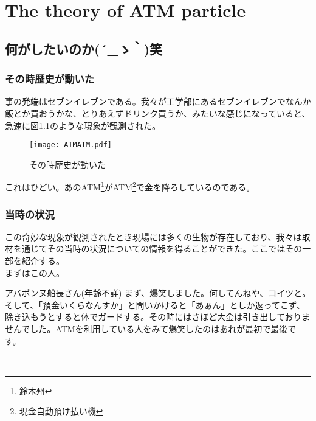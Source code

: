 \chapter{The theory of ATM particle}
\label{theoryofparticle}

\section{何がしたいのか{\sf (´\_ゝ｀)}笑}
\subsection{その時歴史が動いた}
事の発端はセブンイレブンである。我々が工学部にあるセブンイレブンでなんか飯とか買おうかな、とりあえずドリンク買うか、みたいな感じになっていると、急速に図\ref{ATMATM}のような現象が観測された。

\begin{figure}[H]
\centering
\texttt{[image: ATMATM.pdf]}
    \caption{その時歴史が動いた}
    \label{ATMATM}
\end{figure}

これはひどい。あのATM\footnote{鈴木州}がATM\footnote{現金自動預け払い機}で金を降ろしているのである。

\subsection{当時の状況}
この奇妙な現象が観測されたとき現場には多くの生物が存在しており、我々は取材を通じてその当時の状況についての情報を得ることができた。ここではその一部を紹介する。\\

まずはこの人。\\

\begin{itembox}[c]{アバポンヌ船長さん(年齢不詳)}
まず、爆笑しました。何してんねや、コイツと。そして、「預金いくらなんすか」と問いかけると「あぁん」としか返ってこず、除き込もうとすると体でガードする。その時にはさほど大金は引き出しておりませんでした。ATMを利用している人をみて爆笑したのはあれが最初で最後です。
\end{itembox}
\\

